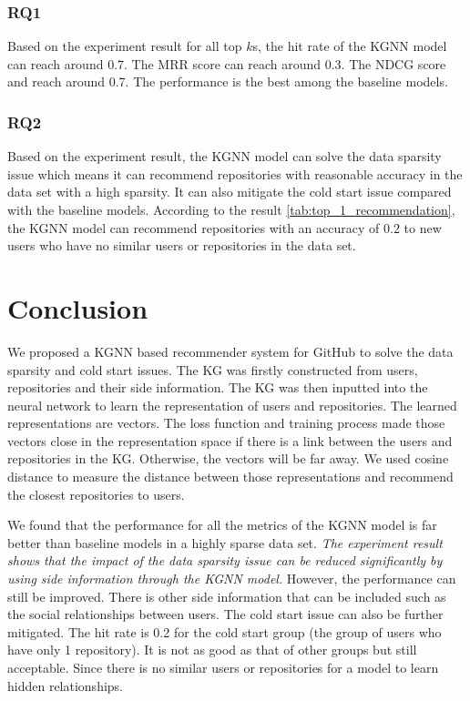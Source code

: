 \documentclass[11pt,twoside]{report}
\begin{document}
\subsection{RQ1}
Based on the experiment result for all top $k$s, the hit rate of the KGNN model can reach around 0.7. The MRR score can reach around 0.3. The NDCG score and reach around 0.7. The performance is the best among the baseline models.

\subsection{RQ2}
Based on the experiment result, the KGNN model can solve the data sparsity issue which means it can recommend repositories with reasonable accuracy in the data set with a high sparsity. It can also mitigate the cold start issue compared with the baseline models. According to the result \ref{tab:top_1_recommendation}, the KGNN model can recommend repositories with an accuracy of 0.2 to new users who have no similar users or repositories in the data set.

\chapter{Conclusion}
We proposed a KGNN based recommender system for GitHub to solve the data sparsity and cold start issues. The KG was firstly constructed from users, repositories and their side information. The KG was then inputted into the neural network to learn the representation of users and repositories. The learned representations are vectors. The loss function and training process made those vectors close in the representation space if there is a link between the users and repositories in the KG. Otherwise, the vectors will be far away. We used cosine distance to measure the distance between those representations and recommend the closest repositories to users.

We found that the performance for all the metrics of the KGNN model is far better than baseline models in a highly sparse data set. \textit{The experiment result shows that the impact of the data sparsity issue can be reduced significantly by using side information through the KGNN model.} However, the performance can still be improved. There is other side information that can be included such as the social relationships between users. The cold start issue can also be further mitigated. The hit rate is 0.2 for the cold start group (the group of users who have only 1 repository). It is not as good as that of other groups but still acceptable. Since there is no similar users or repositories for a model to learn hidden relationships.
\end{document}
